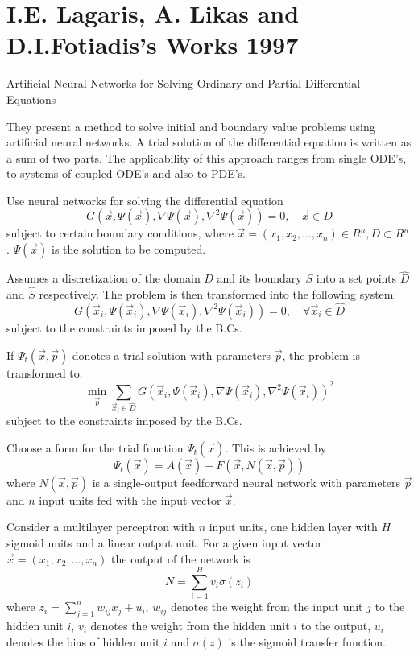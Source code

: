 \section{I.E. Lagaris, A. Likas and D.I.Fotiadis's Works 1997}

Artificial Neural Networks for Solving Ordinary and Partial Differential Equations

They present a method to solve initial and boundary value problems using artificial neural networks. A trial solution of the differential equation is written as a sum of two parts. The applicability of this approach ranges from single ODE's, to systems of coupled ODE's and also to PDE's. 

Use neural networks for solving the differential equation
\begin{equation}
G(\vec x,\Psi(\vec x),\nabla \Psi(\vec x),\nabla^2 \Psi(\vec x)) = 0,\quad \vec x\in D
\end{equation}
subject to certain boundary conditions, where $\vec x = (x_1,x_2,...,x_n)\in R^n, D\subset R^n$. $\Psi(\vec x)$ is the solution to be computed. 

Assumes a discretization of the domain $D$ and its boundary $S$ into a set points $\hat D$ and $\hat S$ respectively. The problem is then transformed into the following system:
\begin{equation}
G(\vec x_i,\Psi(\vec x_i),\nabla \Psi(\vec x_i),\nabla^2 \Psi(\vec x_i)) = 0,\quad\forall \vec x_i\in \hat D
\end{equation}
subject to the constraints imposed by the B.Cs.

If $\Psi_t(\vec x,\vec p)$ donotes a trial solution with parameters $\vec p$, the problem is transformed to:
\begin{equation}
\min_{\vec p} \sum_{\vec x_i\in \hat D} G(\vec x_i,\Psi(\vec x_i),\nabla \Psi(\vec x_i),\nabla^2 \Psi(\vec x_i)) ^2
\end{equation} 
subject to the constraints imposed by the B.Cs.

Choose a form for the trial function $\Psi_t(\vec x)$. This is achieved by
\begin{equation}
 \Psi_t(\vec x) = A(\vec x) + F(\vec x, N(\vec x,\vec p))
\end{equation} 
where $N(\vec x,\vec p)$ is a single-output feedforward neural network with parameters $\vec p$ and $n$ input units fed with the input vector $\vec x$.

Consider a multilayer perceptron with $n$ input units, one hidden layer with $H$ sigmoid units and a linear output unit. For a given input vector $\vec x = (x_1,x_2,...,x_n)$ the output of the network is 
\begin{equation}
N = \sum_{i=1}^H v_i\sigma(z_i)
\end{equation}
where $z_i = \sum_{j = 1}^n w_{ij}x_j+u_i$, $w_{ij}$ denotes the weight from the input unit $j$ to the hidden unit $i$, $v_i$ denotes the weight from the hidden unit $i$ to the output, $u_i$ denotes the bias of hidden unit $i$ and $\sigma(z)$ is the sigmoid transfer function.

